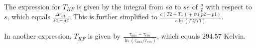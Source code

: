The expression for \( T_{KF} \) is given by the integral from \( sa \) to \( se \) of \( \frac{a}{c} \) with respect to \( s \), which equals \( \frac{\Delta r_{CU}}{sa - se} \). This is further simplified to \( \frac{c (T2 - T1) + \psi (p2 - p1)}{c \ln (T2 / T1)} \).

In another expression, \( T_{KF} \) is given by \( \frac{\tau_{aus} - \tau_{ein}}{\ln (\tau_{aus} / \tau_{ein})} \), which equals \( 294.57 \) Kelvin.